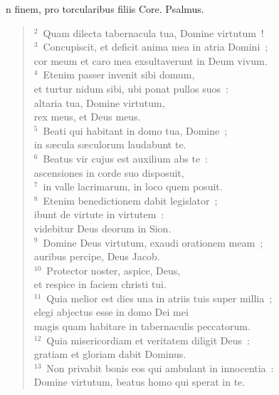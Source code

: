 \bchapter[Psalm]
n finem, pro torcularibus filiis Core. Psalmus.
\begin{verse}${}^{2}$~Quam dilecta tabernacula tua, Domine virtutum~!\\
${}^{3}$~Concupiscit, et deficit anima mea in atria Domini~;\\ cor meum et caro mea exsultaverunt in Deum vivum.\\
${}^{4}$~Etenim passer invenit sibi domum,\\ et turtur nidum sibi, ubi ponat pullos suos~:\\ altaria tua, Domine virtutum,\\ rex meus, et Deus meus.\\
${}^{5}$~Beati qui habitant in domo tua, Domine~;\\ in s\ae cula s\ae culorum laudabunt te.\\
${}^{6}$~Beatus vir cujus est auxilium abs te~:\\ ascensiones in corde suo disposuit,\\
${}^{7}$~in valle lacrimarum, in loco quem posuit.\\
${}^{8}$~Etenim benedictionem dabit legislator~;\\ ibunt de virtute in virtutem~:\\ videbitur Deus deorum in Sion.\\
${}^{9}$~Domine Deus virtutum, exaudi orationem meam~;\\ auribus percipe, Deus Jacob.\\
${}^{10}$~Protector noster, aspice, Deus,\\ et respice in faciem christi tui.\\
${}^{11}$~Quia melior est dies una in atriis tuis super millia~;\\ elegi abjectus esse in domo Dei mei\\ magis quam habitare in tabernaculis peccatorum.\\
${}^{12}$~Quia misericordiam et veritatem diligit Deus~:\\ gratiam et gloriam dabit Dominus.\\
${}^{13}$~Non privabit bonis eos qui ambulant in innocentia~:\\ Domine virtutum, beatus homo qui sperat in te.\end{verse}



